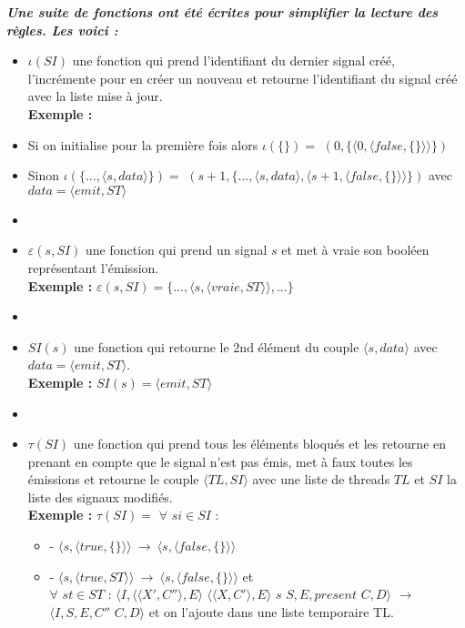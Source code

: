\documentclass[10pt,a4paper]{article}
\begin{document}
					
				\textbf{\textit{Une suite de fonctions ont été écrites pour simplifier la lecture des règles. Les voici :}}
				\smallbreak
				\begin{itemize}
					\item[] $\iota(SI)$ une fonction qui prend l'identifiant du dernier signal créé, l'incrémente pour en créer un nouveau et retourne l'identifiant du signal créé avec la liste mise à jour.
					\\ \textbf{Exemple :}
					\item[] Si on initialise pour la première fois alors  $\iota(\{\}) =$ $(0 ,\{\langle 0,\langle false,\{\}\rangle\rangle\})$
					\item[] Sinon $\iota(\{...,\langle s,data\rangle\}) =$ $(s+1 ,\{...,\langle s,data\rangle,\langle s+1,\langle false,\{\}\rangle\rangle\})$ avec $data = \langle emit,ST\rangle$
					\item[] 
					
					\item[] $\varepsilon(s,SI)$ une fonction qui prend un signal $s$ et met à vraie son booléen représentant l'émission.
					\\\textbf{Exemple :} $\varepsilon(s,SI) = \{...,\langle s,\langle vraie,ST\rangle\rangle,...\}$
					\item[] 
					
					\item[] $SI(s)$ une fonction qui retourne le 2nd élément du couple $\langle s,data\rangle$ avec $data = \langle emit,ST\rangle$.
					\\\textbf{Exemple :} $SI(s) = \langle emit,ST\rangle$
					\item[]  
					
					\item[] $\tau(SI)$ une fonction qui prend tous les éléments bloqués et les retourne en prenant en compte que le signal n'est pas émis, met à faux toutes les émissions et retourne le couple $\langle TL,SI \rangle$ avec une liste de threads $TL$ et $SI$ la liste des signaux modifiés. 
					\\ \textbf{Exemple :} $\tau(SI) =$ $\forall$ $si \in SI$ : 
					\begin{itemize}
						\item[] - $\langle s,\langle true,\{\}\rangle\rangle~\rightarrow~\langle s,\langle false,\{\}\rangle\rangle$
						\item[] - $\langle s,\langle true,ST\rangle\rangle~\rightarrow~\langle s,\langle false,\{\}\rangle\rangle$ et 
						\\$\forall$ $st \in ST$ : $\langle I,\langle\langle X',C''\rangle, E\rangle$ $\langle\langle X,C'\rangle, E\rangle$ $s$ $S,E,present$ $C,D\rangle$ $\rightarrow$ $ \langle I,S,E,C''$ $C,D\rangle$ et on l'ajoute dans une liste temporaire TL.
					\end{itemize}
				\end{itemize}
				\bigbreak
				\bigbreak
					
\end{document}
